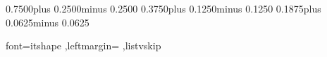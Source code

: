 


\frenchspacing

\setlength{\bigskipamount}   {0.7500\baselineskip plus 0.2500\baselineskip minus 0.2500\baselineskip}
\setlength{\medskipamount}   {0.3750\baselineskip plus 0.1250\baselineskip minus 0.1250\baselineskip}
\setlength{\smallskipamount} {0.1875\baselineskip plus 0.0625\baselineskip minus 0.0625\baselineskip}



\quotingsetup
  {font=itshape
  ,leftmargin=\parindent
  ,listvskip}









\setlength{\pltopsep}   {\medskipamount}
\setlength{\plpartopsep}{\parskip}
\setlength{\plitemsep}  {\parskip}
\setlength{\plparsep}   {\parskip}



